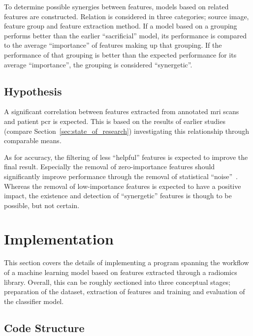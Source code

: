 To determine possible synergies between features, models based on related 
features are constructed. Relation is considered in three categories; source image,
feature group and feature extraction method. If a model based on a grouping performs better
than the earlier \enquote{sacrificial} model, %
its performance is compared to the average \enquote{importance} of features making up
that grouping. If the performance of that grouping is better than the 
expected performance for its average \enquote{importance}, the grouping is 
considered \enquote{synergetic}.

\subsection{Hypothesis}\label{sec:hypothesis}

A significant correlation between features extracted from annotated \ac{mri} 
scans and patient \ac{pcr} is expected. This is based on the results of earlier 
studies (compare Section~\ref{sec:state_of_research}) investigating this relationship 
through comparable means. 

As for accuracy, the filtering of less \enquote{helpful} features is expected to
improve the final result. Especially the removal of zero-importance features 
should significantly improve performance through the removal of statistical
\enquote{noise}~\cite{elements_of_statistical_learning}. Whereas the removal 
of low-importance features is expected to have a positive impact, the existence 
and detection of \enquote{synergetic} features is though to be possible, but not
certain. 

\newpage{}
\section{Implementation}\label{sec:implementation}

This section covers the details of implementing a program spanning the workflow
of a machine learning model based on features extracted through a radiomics 
library. Overall, this can be roughly sectioned into three conceptual stages; 
preparation of the dataset, extraction of features and training and evaluation 
of the classifier model.



\subsection{Code Structure}\label{sec:code_structure} %

